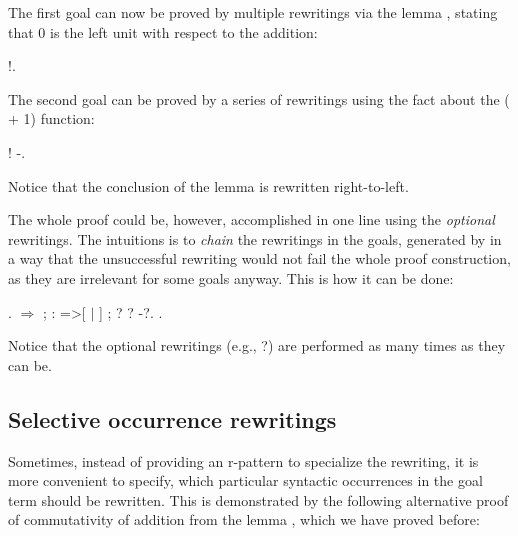 The first goal can now be proved by multiple rewritings via the lemma
, stating that 0 is the left unit with respect to the
addition:


\begin{coqdoccode}
\coqdocemptyline
\coqdocnoindent
{}  !.\coqdoceol
\coqdocemptyline
\end{coqdoccode}


The second goal can be proved by a series of rewritings using the fact
about the (\coqdocvar{\_} + 1) function:


 \begin{coqdoccode}
\coqdocemptyline
\coqdocnoindent
{}  ! -.\coqdoceol
\coqdocemptyline
\end{coqdoccode}
\noindent
Notice that the conclusion of the  lemma is rewritten right-to-left.


The whole proof could be, however, accomplished in one line using the
\textit{optional} rewritings. The intuitions is to \textit{chain} the rewritings
in the goals, generated by  in a way that the unsuccessful
rewriting would not fail the whole proof construction, as they are
irrelevant for some goals anyway. This is how it can be done:


\begin{coqdoccode}
\coqdocemptyline
\coqdocnoindent
{}.\coqdoceol
\coqdocnoindent
{} \ensuremath{\Rightarrow} ; : =>[ \ensuremath{|}   ] ;  ? ? -?.\coqdoceol
\coqdocnoindent
{}.\coqdoceol
\coqdocemptyline
\end{coqdoccode}


Notice that the optional rewritings (e.g., ?) are
performed as many times as they can be.


\subsection{Selective occurrence rewritings}




Sometimes, instead of providing an r-pattern to specialize the
rewriting, it is more convenient to specify, which particular
syntactic occurrences in the goal term
should be rewritten. This is demonstrated by the following alternative
proof of commutativity of addition from the lemma , which we
have proved before:


